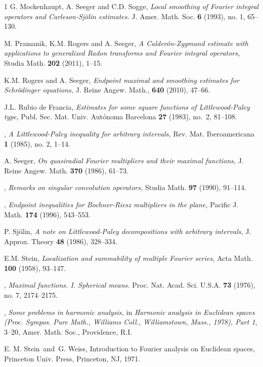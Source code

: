 \documentclass[11pt]{amsart}
\theoremstyle{definition}
\numberwithin{theorem}{section}
\numberwithin{definition}{section}
\def\emph#1{{\it #1 }}
\begin{document}
\begin{thebibliography}{1}
 G. Mockenhaupt, A.  Seeger and  C.D. Sogge, 
\emph{Local smoothing of Fourier integral operators and Carleson-Sj\"olin estimates.}  J. Amer. Math. Soc.  {\bf 6}  (1993),  no. 1, 65--130.

 M. Pramanik, K.M. Rogers and A. Seeger,
\emph{A Calder\'on-Zygmund estimate with applications to generalized
Radon transforms and Fourier integral operators,} Studia Math. {\bf
202} (2011), 1--15.

  K.M. Rogers and A. Seeger,  \emph{Endpoint maximal and smoothing estimates for Schr\"odinger equations,} J. Reine Angew. Math.,
{\bf  640}  (2010), 47--66.

 J.L. Rubio de Francia, \emph{Estimates for some square functions of
Littlewood-Paley type,} Publ. Sec. Mat. Univ. Aut\'onoma Barcelona {\bf 27} (1983), no.~2, 81--108.

 \bysame, \emph{A Littlewood-Paley inequality for arbitrary intervals,}
Rev. Mat. Iberoamericana {\bf 1} (1985), no. 2, 1--14.


 A. Seeger, \emph{On quasiradial Fourier multipliers and their maximal functions,} J. Reine Angew. Math.  {\bf 370} (1986), {61--73}.

 \bysame, \emph{Remarks on singular convolution operators,}  Studia Math.  {\bf 97}  (1990), {91--114}.


 \bysame,
\emph {Endpoint inequalities for Bochner-Riesz multipliers in the
plane,}
  Pacific J. Math.  {\bf 174}  (1996),   543--553.

 P. Sj{\"o}lin,
   \emph{A note on Littlewood-Paley decompositions with arbitrary
   intervals,}
J. Approx. Theory {\bf 48} (1986), 328--334.



 E.M. Stein, \emph{Localization and summability of multiple Fourier series,}
Acta Math. {\bf 100} (1958),  93--147.

 \bysame, \emph{Maximal functions. I. Spherical means.}  Proc. Nat. Acad. Sci. U.S.A.  {\bf 73}  (1976), no. 7, 2174--2175.


 \bysame, \emph{Some problems in harmonic analysis,} in {\it Harmonic analysis in Euclidean spaces (Proc. Sympos. Pure Math., Williams Coll., Williamstown, Mass., 1978), Part 1}, 3--20, Amer. Math. Soc., Providence, R.I.

 E. M. Stein\ and\ G. Weiss, Introduction to Fourier analysis on Euclidean spaces, Princeton Univ. Press, Princeton, NJ, 1971.




\end{thebibliography}
\end{document}
